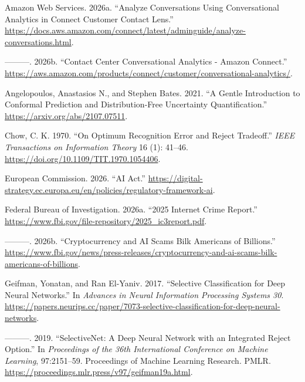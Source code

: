 \documentclass[
]{article}
\newlength{\cslhangindent}
\newlength{\cslentryspacingunit} %
\newenvironment{CSLReferences}[2] %
 {%
  \setlength{\parindent}{0pt}
  \ifodd #1
  \let\oldpar\par
  \def\par{\hangindent=\cslhangindent\oldpar}
  \fi
  \setlength{\parskip}{#2\cslentryspacingunit}
 }%
 {}
\begin{document}
\hypertarget{refs}{}
\begin{CSLReferences}{1}{0}
\leavevmode{}%
Amazon Web Services. 2026a. {``Analyze Conversations Using
Conversational Analytics in Connect Customer Contact Lens.''}
\url{https://docs.aws.amazon.com/connect/latest/adminguide/analyze-conversations.html}.

\leavevmode{}%
---------. 2026b. {``Contact Center Conversational Analytics - Amazon
Connect.''}
\url{https://aws.amazon.com/products/connect/customer/conversational-analytics/}.

\leavevmode{}%
Angelopoulos, Anastasios N., and Stephen Bates. 2021. {``A Gentle
Introduction to Conformal Prediction and Distribution-Free Uncertainty
Quantification.''} \url{https://arxiv.org/abs/2107.07511}.

\leavevmode{}%
Chow, C. K. 1970. {``On Optimum Recognition Error and Reject
Tradeoff.''} \emph{IEEE Transactions on Information Theory} 16 (1):
41--46. \url{https://doi.org/10.1109/TIT.1970.1054406}.

\leavevmode{}%
European Commission. 2026. {``AI Act.''}
\url{https://digital-strategy.ec.europa.eu/en/policies/regulatory-framework-ai}.

\leavevmode{}%
Federal Bureau of Investigation. 2026a. {``2025 Internet Crime
Report.''} \url{https://www.fbi.gov/file-repository/2025_ic3report.pdf}.

\leavevmode{}%
---------. 2026b. {``Cryptocurrency and AI Scams Bilk Americans of
Billions.''}
\url{https://www.fbi.gov/news/press-releases/cryptocurrency-and-ai-scams-bilk-americans-of-billions}.

\leavevmode{}%
Geifman, Yonatan, and Ran El-Yaniv. 2017. {``Selective Classification
for Deep Neural Networks.''} In \emph{Advances in Neural Information
Processing Systems 30}.
\url{https://papers.neurips.cc/paper/7073-selective-classification-for-deep-neural-networks}.

\leavevmode{}%
---------. 2019. {``SelectiveNet: A Deep Neural Network with an
Integrated Reject Option.''} In \emph{Proceedings of the 36th
International Conference on Machine Learning}, 97:2151--59. Proceedings
of Machine Learning Research. PMLR.
\url{https://proceedings.mlr.press/v97/geifman19a.html}.


\end{CSLReferences}
\end{document}
